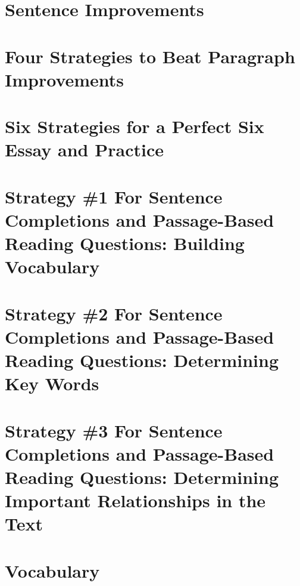 \documentclass[12pt]{book}
\begin{document}
\chapter{Sentence Improvements}
	
	
	
	
	

\chapter{Four Strategies to Beat Paragraph Improvements}
	
	
	
	
	
	

\chapter{Six Strategies for a Perfect Six Essay and Practice}
	
	
	
	
	
	
	
	

\chapter{Strategy \#1 For Sentence Completions and Passage-Based Reading Questions: Building Vocabulary}
	
	
	
	
	
	
	
	
	
	
	
	
	

\chapter{Strategy \#2 For Sentence Completions and Passage-Based Reading Questions: Determining Key Words}
	
	
	
	
	
	
	

\chapter{Strategy \#3 For Sentence Completions and Passage-Based Reading Questions: Determining Important Relationships in the Text}
	
	
	
	
	

\chapter{Vocabulary}
	


\end{document}
